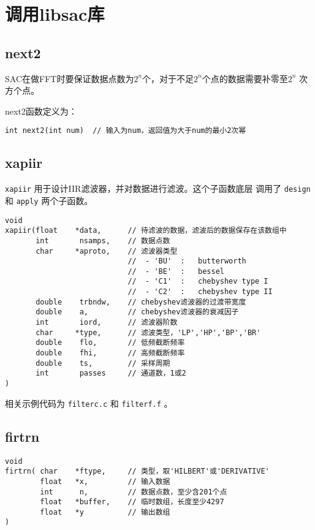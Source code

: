 \section{调用libsac库}
\label{sec:libsac}
\subsection{next2}
SAC在做FFT时要保证数据点数为$2^n$个，对于不足$2^n$个点的数据需要补零至$2^n$
次方个点。

next2函数定义为：
\begin{verbatim}
int next2(int num)  // 输入为num，返回值为大于num的最小2次幂
\end{verbatim}

\subsection{xapiir}
\texttt{xapiir} 用于设计IIR滤波器，并对数据进行滤波。这个子函数底层
调用了 \texttt{design} 和 \texttt{apply} 两个子函数。
\begin{verbatim}
void
xapiir(float    *data,      // 待滤波的数据，滤波后的数据保存在该数组中
       int       nsamps,    // 数据点数
       char     *aproto,    // 滤波器类型
                            //  - 'BU'  :   butterworth
                            //  - 'BE'  :   bessel
                            //  - 'C1'  :   chebyshev type I
                            //  - 'C2'  :   chebyshev type II
       double    trbndw,    // chebyshev滤波器的过渡带宽度
       double    a,         // chebyshev滤波器的衰减因子
       int       iord,      // 滤波器阶数
       char     *type,      // 滤波类型，'LP','HP','BP','BR'
       double    flo,       // 低频截断频率
       double    fhi,       // 高频截断频率
       double    ts,        // 采样周期
       int       passes     // 通道数，1或2
)
\end{verbatim}

相关示例代码为 \texttt{filterc.c} 和 \texttt{filterf.f} 。

\subsection{firtrn}
\begin{verbatim}
void
firtrn( char    *ftype,     // 类型，取'HILBERT'或'DERIVATIVE'
        float   *x,         // 输入数据
        int      n,         // 数据点数，至少含201个点
        float   *buffer,    // 临时数组，长度至少4297
        float   *y          // 输出数组
)
\end{verbatim}

